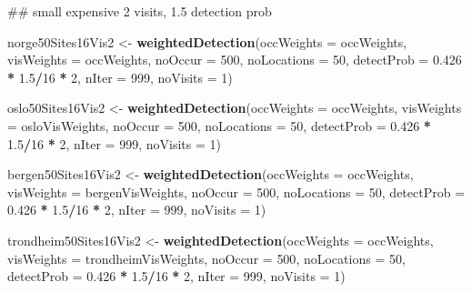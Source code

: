 \documentclass[]{article}
\newenvironment{Shaded}{\begin{snugshade}}{\end{snugshade}}
\newcommand{\KeywordTok}[1]{\textcolor[rgb]{0.13,0.29,0.53}{\textbf{#1}}}
\newcommand{\DataTypeTok}[1]{\textcolor[rgb]{0.13,0.29,0.53}{#1}}
\newcommand{\DecValTok}[1]{\textcolor[rgb]{0.00,0.00,0.81}{#1}}
\newcommand{\FloatTok}[1]{\textcolor[rgb]{0.00,0.00,0.81}{#1}}
\newcommand{\StringTok}[1]{\textcolor[rgb]{0.31,0.60,0.02}{#1}}
\newcommand{\OperatorTok}[1]{\textcolor[rgb]{0.81,0.36,0.00}{\textbf{#1}}}
\newcommand{\NormalTok}[1]{#1}
\begin{document}
\begin{Shaded}
\begin{Highlighting}[]
\NormalTok{## small expensive 2 visits, 1.5 detection prob}

\NormalTok{norge50Sites16Vis2 <-}\StringTok{ }\KeywordTok{weightedDetection}\NormalTok{(}\DataTypeTok{occWeights =}\NormalTok{ occWeights, }\DataTypeTok{visWeights =}\NormalTok{ occWeights, }
    \DataTypeTok{noOccur =} \DecValTok{500}\NormalTok{, }\DataTypeTok{noLocations =} \DecValTok{50}\NormalTok{, }\DataTypeTok{detectProb =} \FloatTok{0.426} \OperatorTok{*}\StringTok{ }\FloatTok{1.5}\OperatorTok{/}\DecValTok{16} \OperatorTok{*}\StringTok{ }\DecValTok{2}\NormalTok{, }\DataTypeTok{nIter =} \DecValTok{999}\NormalTok{, }
    \DataTypeTok{noVisits =} \DecValTok{1}\NormalTok{)}

\NormalTok{oslo50Sites16Vis2 <-}\StringTok{ }\KeywordTok{weightedDetection}\NormalTok{(}\DataTypeTok{occWeights =}\NormalTok{ occWeights, }\DataTypeTok{visWeights =}\NormalTok{ osloVisWeights, }
    \DataTypeTok{noOccur =} \DecValTok{500}\NormalTok{, }\DataTypeTok{noLocations =} \DecValTok{50}\NormalTok{, }\DataTypeTok{detectProb =} \FloatTok{0.426} \OperatorTok{*}\StringTok{ }\FloatTok{1.5}\OperatorTok{/}\DecValTok{16} \OperatorTok{*}\StringTok{ }\DecValTok{2}\NormalTok{, }\DataTypeTok{nIter =} \DecValTok{999}\NormalTok{, }
    \DataTypeTok{noVisits =} \DecValTok{1}\NormalTok{)}


\NormalTok{bergen50Sites16Vis2 <-}\StringTok{ }\KeywordTok{weightedDetection}\NormalTok{(}\DataTypeTok{occWeights =}\NormalTok{ occWeights, }\DataTypeTok{visWeights =}\NormalTok{ bergenVisWeights, }
    \DataTypeTok{noOccur =} \DecValTok{500}\NormalTok{, }\DataTypeTok{noLocations =} \DecValTok{50}\NormalTok{, }\DataTypeTok{detectProb =} \FloatTok{0.426} \OperatorTok{*}\StringTok{ }\FloatTok{1.5}\OperatorTok{/}\DecValTok{16} \OperatorTok{*}\StringTok{ }\DecValTok{2}\NormalTok{, }\DataTypeTok{nIter =} \DecValTok{999}\NormalTok{, }
    \DataTypeTok{noVisits =} \DecValTok{1}\NormalTok{)}


\NormalTok{trondheim50Sites16Vis2 <-}\StringTok{ }\KeywordTok{weightedDetection}\NormalTok{(}\DataTypeTok{occWeights =}\NormalTok{ occWeights, }\DataTypeTok{visWeights =}\NormalTok{ trondheimVisWeights, }
    \DataTypeTok{noOccur =} \DecValTok{500}\NormalTok{, }\DataTypeTok{noLocations =} \DecValTok{50}\NormalTok{, }\DataTypeTok{detectProb =} \FloatTok{0.426} \OperatorTok{*}\StringTok{ }\FloatTok{1.5}\OperatorTok{/}\DecValTok{16} \OperatorTok{*}\StringTok{ }\DecValTok{2}\NormalTok{, }\DataTypeTok{nIter =} \DecValTok{999}\NormalTok{, }
    \DataTypeTok{noVisits =} \DecValTok{1}\NormalTok{)}



\end{Highlighting}
\end{Shaded}
\end{document}
